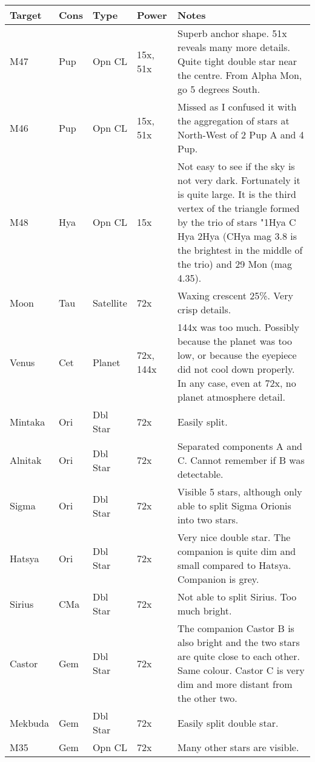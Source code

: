 \begin{longtable}{ p{0.8in}  p{0.3in}  p{0.5in}  p{0.9in}  p{5.8in} }
\hline 
{\bf Target} & {\bf Cons} & {\bf Type} & {\bf Power} & {\bf Notes} \\ 
\hline 
M47 & Pup & Opn CL & 15x, 51x & Superb anchor shape. 51x reveals many more details. Quite tight double star near the centre. From Alpha Mon, go 5 degrees South. \\ 
M46 & Pup & Opn CL & 15x, 51x & Missed as I confused it with the aggregation of stars at North-West of 2 Pup A and 4 Pup.  \\ 
M48 & Hya & Opn CL & 15x & Not easy to see if the sky is not very dark. Fortunately it is quite large. It is the third vertex of the triangle formed by the trio of stars "1Hya C Hya 2Hya (CHya mag 3.8 is the brightest in the middle of the trio) and 29 Mon (mag 4.35).  \\ 
Moon & Tau & Satellite & 72x & Waxing crescent 25\%. Very crisp details.  \\ 
Venus & Cet & Planet & 72x, 144x & 144x was too much. Possibly because the planet was too low, or because the eyepiece did not cool down properly. In any case, even at 72x, no planet atmosphere detail.  \\ 
Mintaka & Ori & Dbl Star & 72x & Easily split.  \\ 
Alnitak & Ori & Dbl Star & 72x & Separated components A and C. Cannot remember if B was detectable. \\ 
Sigma & Ori & Dbl Star & 72x & Visible 5 stars, although only able to split Sigma Orionis into two stars. \\ 
Hatsya & Ori & Dbl Star & 72x & Very nice double star. The companion is quite dim and small compared to Hatsya. Companion is grey.  \\ 
Sirius & CMa & Dbl Star & 72x & Not able to split Sirius. Too much bright. \\ 
Castor & Gem & Dbl Star & 72x & The companion Castor B is also bright and the two stars are quite close to each other. Same colour. Castor C is very dim and more distant from the other two. \\ 
Mekbuda & Gem & Dbl Star & 72x & Easily split double star. \\ 
M35 & Gem & Opn CL & 72x & Many other stars are visible.  \\ 
\hline 
\end{longtable} 
